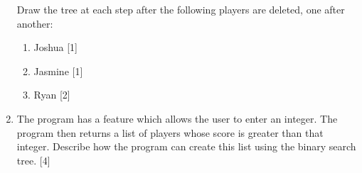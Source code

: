 \begin{enumerate}
Draw the tree at each step after the following players are deleted,
one after another:
\begin{enumerate}
\item Joshua \hfill{}{[}1{]}
\item Jasmine\hfill{} {[}1{]}
\item Ryan \hfill{}{[}2{]}
\end{enumerate}
\item The program has a feature which allows the user to enter an integer.
The program then returns a list of players whose score is greater
than that integer. Describe how the program can create this list using
the binary search tree. \hfill{}{[}4{]}
\end{enumerate}